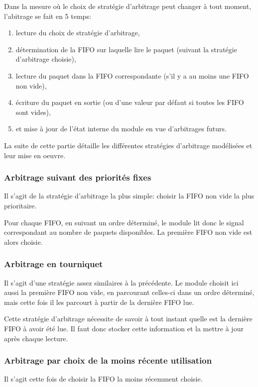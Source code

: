 \documentclass[11pt]{article}
\begin{document}
Dans la mesure où le choix de stratégie d'arbitrage peut changer à tout moment,
l'abitrage se fait en 5 temps:
\begin{enumerate}
\item lecture du choix de stratégie d'arbitrage,
\item détermination de la FIFO sur laquelle lire le paquet (suivant la stratégie d'arbitrage choisie),
\item lecture du paquet dans la FIFO correspondante (s'il y a au moins une FIFO non vide),
\item écriture du paquet en sortie (ou d'une valeur par défaut si toutes les FIFO sont vides),
\item et mise à jour de l'état interne du module en vue d'arbitrages futurs.
\end{enumerate}

La suite de cette partie détaille les différentes stratégies d'arbitrage modélisées et leur mise en oeuvre.

\subsubsection{Arbitrage suivant des priorités fixes}
Il s'agit de la stratégie d'arbitrage la plus simple: choisir la FIFO non vide la plus prioritaire.

Pour chaque FIFO, en suivant un ordre déterminé, le module lit donc le signal correspondant au nombre de paquets disponibles.
La première FIFO non vide est alors choisie.

\subsubsection{Arbitrage en tourniquet}
Il s'agit d'une stratégie assez similaires à la précédente.
Le module choisit ici aussi la première FIFO non vide, en parcourant celles-ci dans un ordre déterminé,
mais cette fois il les parcourt à partir de la dernière FIFO lue.

Cette stratégie d'arbitrage nécessite de savoir à tout instant quelle est la dernière FIFO à avoir été lue.
Il faut donc stocker cette information et la mettre à jour après chaque lecture.

\subsubsection{Arbitrage par choix de la moins récente utilisation}
Il s'agit cette fois de choisir la FIFO la moins récemment choisie.
\end{document}
